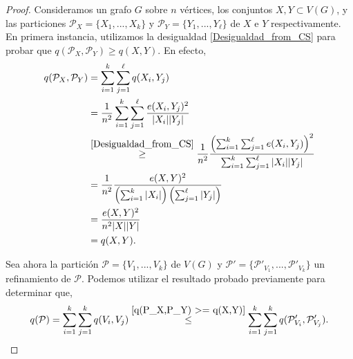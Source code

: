 \documentclass{article}[14pts]
\begin{document}
\begin{proof}
    Consideramos un grafo $G$ sobre $n$ vértices, los conjuntos $X,Y\subset V(G)$, y las particiones $\mathcal{P}_{X} = \lbrace X_1,...,X_k\rbrace$ y $\mathcal{P}_{Y} = \lbrace Y_1,...,Y_\ell\rbrace$ de $X$ e $Y$ respectivamente. En primera instancia, utilizamos la desigualdad \eqref{Desigualdad_from_CS} para probar que $q(\mathcal{P}_{X}, \mathcal{P}_{Y}) \geq q(X,Y)$. En efecto,
    \begin{equation} \label{q(P_X,P_Y) >= q(X,Y)}
        \begin{split}
            q(\mathcal{P}_{X}, \mathcal{P}_{Y}) &= \sum_{i = 1}^{k}\sum_{j = 1}^{\ell} q(X_{i}, Y_{j})\\
            &= \frac{1}{n^{2}} \sum_{i = 1}^{k}\sum_{j = 1}^{\ell} \frac{e(X_i,Y_j)^{2}}{|X_i||Y_j|}\\
            &\overset{\eqref{Desigualdad_from_CS}}{\geq} \frac{1}{n^{2}}\frac{\left( \sum_{i = 1}^{k}\sum_{j = 1}^{\ell} e(X_i,Y_j)\right)^{2}}{\sum_{i = 1}^{k}\sum_{j = 1}^{\ell} |X_i||Y_j|}\\
            &= \frac{1}{n^{2}} \frac{e(X,Y)^{2}}{\left( \sum_{i = 1}^{k} |X_i| \right)\left( \sum_{j = 1}^{\ell} |Y_j|\right)}\\
            &= \frac{e(X,Y)^{2}}{n^{2}|X||Y|}\\
            &= q(X,Y).    
        \end{split}
    \end{equation}

    Sea ahora la partición $\mathcal{P} = \lbrace V_1,...,V_k\rbrace$ de $V(G)$ y $\mathcal{P}' = \lbrace \mathcal{P}'_{V_1},...,\mathcal{P}'_{V_k}\rbrace$ un refinamiento de $\mathcal{P}$. Podemos utilizar el resultado probado previamente para determinar que,
    \begin{equation*}
        q(\mathcal{P}) = \sum_{i=1}^{k}\sum_{j=1}^{k} q(V_i,V_j) \overset{\eqref{q(P_X,P_Y) >= q(X,Y)}}{\leq} \sum_{i=1}^{k}\sum_{j=1}^{k} q(\mathcal{P}'_{V_i}, \mathcal{P}'_{V_j}).
    \end{equation*}
\end{proof}\medskip
\end{document}
